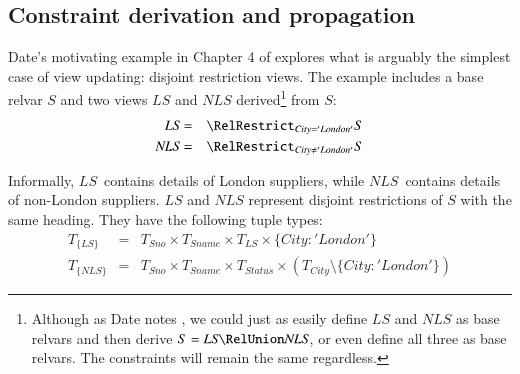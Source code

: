 \documentclass{sig-alternate-05-2015}
\newcounter{constraint}
\newcommand{\LS}{\ensuremath{\mathit{LS}}}
\newcommand{\NLS}{\ensuremath{\mathit{NLS}}}
\newcommand{\Sno}{\ensuremath{\mathit{Sno}}}
\newcommand{\Sname}{\ensuremath{\mathit{Sname}}}
\newcommand{\Status}{\ensuremath{\mathit{Status}}}
\newcommand{\City}{\ensuremath{\mathit{City}}}
\newcommand{\T}[1]{\ensuremath{T_{#1}}}
\newcommand{\TT}[1]{\ensuremath{T_{\{#1\}}}}
\newcommand{\CityLondon}{\ensuremath{\{\City\colon\allowbreak\mathit{'London'}\}}}
\newcommand{\TCityMinusLondon}{\ensuremath{\T{\City} \setminus \CityLondon}}
\begin{document}


\subsection{Constraint derivation and propagation}
\label{sec-constraints}

\noindent Date's motivating example in Chapter 4 of \cite{Date.C-2013a-View} explores what is arguably the simplest case of view updating: disjoint restriction views. The example includes a base relvar \(S\!\) and two views \(\LS\) and \(\NLS\) derived\footnote{Although as Date notes \cite{Date.C-2013a-View}, we could just as easily define \(\LS\) and \(\NLS\) as base relvars and then derive \(S = \LS \RelUnion \NLS\), or even define all three as base relvars. The constraints will remain the same regardless.} from \(S\!\):
\begin{eqnarray}
    \LS  & = & \RelRestrict_{\City = \mathit{'London'}}S \label{eqn-ls}   \\
    \NLS & = & \RelRestrict_{\City \ne \mathit{'London'}}S \label{eqn-nls}
\end{eqnarray}

Informally, \LS\ contains details of London suppliers, while \NLS\ contains details of non-London suppliers. \(\LS\) and  \(\NLS\) represent disjoint restrictions of \(S\!\) with the same heading. They have the following tuple types:
\begin{eqnarray}
    \TT{\LS}  & = & \T{\Sno} \times \T{\Sname} \times \T{\LS} \times \CityLondon \nonumber    \\
    \TT{\NLS} & = & \T{\Sno} \times \T{\Sname} \times \T{\Status} \times (\TCityMinusLondon) \nonumber
\end{eqnarray}
\end{document}
